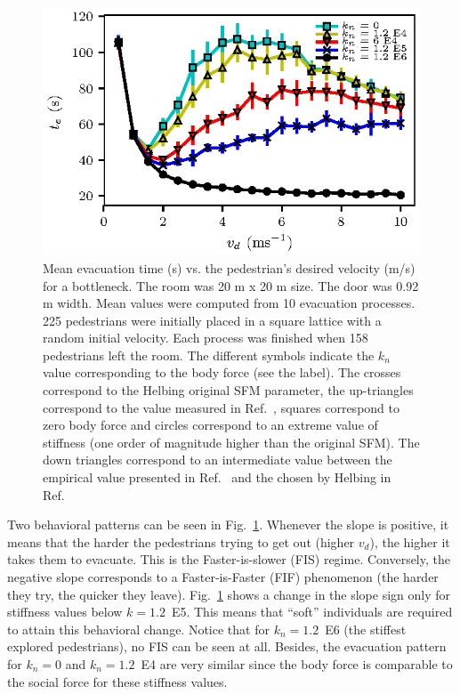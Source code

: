\documentclass[preprint,12pt]{elsarticle}
\begin{document}
\begin{figure}[htbp!]
\centering
\includegraphics[width=0.7\columnwidth]
{./vd_vs_te_N225.eps}
\caption{\label{vd_vs_te}Mean evacuation time (s) vs. the pedestrian’s desired velocity (m/s) for a bottleneck. The room was 20 m x 20 m size. The door was 0.92 m width. Mean values were computed from 10 evacuation processes. 225 pedestrians were initially placed in a square lattice with a random initial velocity. Each process was finished when 158 pedestrians left the room. The different symbols indicate the $k_n$ value corresponding to the body force (see the label). The crosses correspond to the Helbing original SFM parameter, the up-triangles correspond to the value measured in Ref.~\cite{gordon1989anthropometric}, squares correspond to zero body force and circles correspond to an extreme value of stiffness (one order of magnitude higher than the original SFM). The down triangles correspond to an intermediate value between the empirical value presented in Ref.~\cite{gordon1989anthropometric} and the chosen by Helbing in Ref.~\cite{helbing_2000} }
\end{figure}

Two behavioral patterns can be seen in Fig.~\ref{vd_vs_te}. Whenever the slope is positive, it means that the harder the pedestrians trying to get out (higher $v_d$), the higher it takes them to evacuate. This is the Faster-is-slower (FIS) regime. Conversely, the negative slope corresponds to a Faster-is-Faster (FIF) phenomenon (the harder they try, the quicker they leave). Fig.~\ref{vd_vs_te} shows a change in the slope sign only for stiffness values below $k=1.2$~E5. This means that ``soft'' individuals are required to attain this behavioral change.   Notice that for  $k_n=1.2$~E6 (the stiffest explored pedestrians), no FIS can be seen at all. Besides, the evacuation pattern for $k_n = 0$ and $k_n = 1.2$~E4 are very similar since the body force is comparable to the social force for these stiffness values. \\
\end{document}
